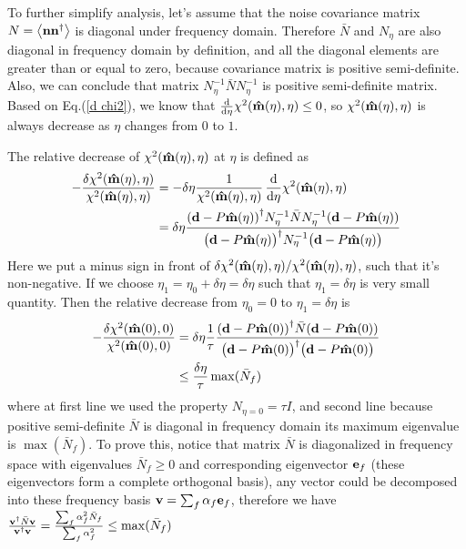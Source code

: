 \documentclass[11pt, letterpaper]{article}
\newcommand{\vbd}{\vb{d}}
\newcommand{\vbn}{\vb{n}}
\newcommand{\inv}[1]{#1^{-1}}
\newcommand{\hatm}{\vb{\hat{m}}}
\newcommand{\Nbar}{\bar{N}}
\newcommand{\Neta}{N_{\eta}}
\begin{document}
To further simplify analysis, let's assume that the noise covariance matrix
$N = \ev{\vbn\vbn^{\dagger}}$ is diagonal under frequency domain.
Therefore $\Nbar$ and $\Neta$ are also diagonal in frequency domain by
definition, and all the diagonal elements are greater than or equal to zero,
because covariance matrix is positive semi-definite.
Also, we can conclude that matrix
$\inv{\Neta} \Nbar \inv{\Neta}$ is positive semi-definite matrix.
Based on Eq.(\ref{d chi2}), we know that
$\dv{\eta} \chi^2({\hatm(\eta), \eta}) \leq 0$,
so $\chi^2(\hatm(\eta), \eta)$ is always decrease
as $\eta$ changes from $0$ to $1$.

The relative decrease of $\chi^2(\hatm(\eta), \eta)$ at $\eta$ is defined as
\begin{align}
\begin{aligned}[b]
-\frac{\delta \chi^2(\hatm(\eta),\eta)} {\chi^2(\hatm(\eta), \eta)}
&=
-\delta \eta \frac{1}{\chi^2(\hatm(\eta), \eta)} \, 
\dv{\eta} \chi^2(\hatm(\eta), \eta) 
\\&= 
\delta \eta 
\frac{\qty(\vbd - P\hatm(\eta))^{\dagger}
    \inv{\Neta} \Nbar \inv{\Neta}
    (\vbd - P\hatm(\eta)) 
}
{\qty\big(\vbd - P \hatm(\eta))^{\dagger} 
    \inv{\Neta}
    \qty\big(\vbd - P\hatm(\eta))
}
\end{aligned}
\end{align}
Here we put a minus sign in front of
$\delta\chi^2(\hatm(\eta), \eta)/\chi^2(\hatm(\eta), \eta)$,
such that it's non-negative.
If we choose $\eta_1 = \eta_0 + \delta\eta = \delta\eta$
such that $\eta_1 = \delta \eta$ is very small quantity.
Then the relative decrease from $\eta_0= 0$ to $\eta_1 = \delta \eta$ is
\begin{align}
\begin{aligned}[b]
-\frac{\delta \chi^2(\hatm(0), 0)}{\chi^2(\hatm(0), 0)} 
&= \delta \eta 
\frac{1}{\tau}
\frac{\qty(\vbd - P\hatm(0))^{\dagger} \Nbar  (\vbd - P\hatm(0)) }
    {\qty\big(\vbd - P \hatm(0))^{\dagger} \qty\big(\vbd - P\hatm(0))}
\\
& \leq  \frac{\delta \eta}{\tau} \max(\Nbar_f)
\end{aligned}
\end{align}
where at first line we used the property $N_{\eta=0} = \tau I$,
and second line because positive semi-definite $\Nbar$ is diagonal in frequency 
domain its maximum eigenvalue is $\max(\Nbar_f)$.
To prove this, notice that matrix $\Nbar$ is diagonalized in frequency space 
with eigenvalues $\Nbar_f\geq0$ and corresponding eigenvector $\vb{e}_f$
(these eigenvectors form a complete orthogonal basis),
any vector could be decomposed into these frequency basis
$\vb{v} = \sum_f \alpha_f \vb{e}_f$, therefore we have
$\frac{\vb{v}^{\dagger} \Nbar \vb{v}}{\vb{v}^{\dagger} \vb{v}} 
= \frac{\sum_f \alpha_f^2\Nbar_f}{\sum_f \alpha_f^2}
\leq \max(\Nbar_f) $
\end{document}
